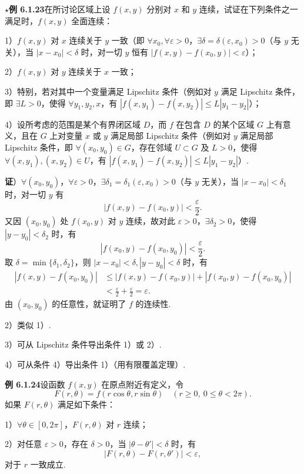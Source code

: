 \documentclass[UTF8,12pt,a4paper,fontset=fandol]{ctexart}
\begin{document}
\noindent\textbf{$\star$例 6.1.23}\quad 在所讨论区域上设 $f(x,y)$ 分别对 $x$ 和 $y$ 连续，试证在下列条件之一满足时，$f(x,y)$ 全面连续：

1）$f(x,y)$ 对 $x$ 连续关于 $y$ 一致（即 $\forall x_0,\forall\varepsilon>0$，$\exists\delta=\delta(\varepsilon,x_0)>0$（与 $y$ 无关），当 $|x-x_0|<\delta$ 时，对一切 $y$ 恒有 $|f(x,y)-f(x_0,y)|<\varepsilon$）；

2）$f(x,y)$ 对 $y$ 连续关于 $x$ 一致；

3）特别，若对其中一个变量满足 Lipschitz 条件（例如对 $y$ 满足 Lipschitz 条件，即 $\exists L>0$，使得 $\forall y_1,y_2,x$，有 $|f(x,y_1)-f(x,y_2)|\le L|y_1-y_2|$）；

4）设所考虑的范围是某个有界闭区域 $D$，而 $f$ 在包含 $D$ 的某个区域 $G$ 上有意义，且在 $G$ 上对变量 $x$ 或 $y$ 满足局部 Lipschitz 条件（例如对 $y$ 满足局部 Lipschitz 条件，即 $\forall(x_0,y_0)\in G$，存在邻域 $U\subset G$ 及 $L>0$，使得 $\forall(x,y_1),(x,y_2)\in U$，有 $|f(x,y_1)-f(x,y_2)|\le L|y_1-y_2|$）.

\noindent\textbf{证}）$\forall(x_0,y_0)$，$\forall\varepsilon>0$，$\exists\delta_1=\delta_1(\varepsilon,x_0)>0$（与 $y$ 无关），当 $|x-x_0|<\delta_1$ 时，对一切 $y$ 有
\[
  |f(x,y)-f(x_0,y)|<\frac{\varepsilon}{2}.
\]
又因 $(x_0,y_0)$ 处 $f(x_0,y)$ 对 $y$ 连续，故对此 $\varepsilon>0$，$\exists\delta_2>0$，使得 $|y-y_0|<\delta_2$ 时，有
\[
  |f(x_0,y)-f(x_0,y_0)|<\frac{\varepsilon}{2}.
\]
取 $\delta=\min\{\delta_1,\delta_2\}$，则 $|x-x_0|<\delta,|y-y_0|<\delta$ 时，有
\[
\begin{aligned}
|f(x,y)-f(x_0,y_0)|
&\le |f(x,y)-f(x_0,y)|+|f(x_0,y)-f(x_0,y_0)|\\
&<\frac{\varepsilon}{2}+\frac{\varepsilon}{2}=\varepsilon.
\end{aligned}
\]
由 $(x_0,y_0)$ 的任意性，就证明了 $f$ 的连续性.

2）类似 1）.

3）可从 Lipschitz 条件导出条件 1）或 2）.

4）可从条件 4）导出条件 1）（用有限覆盖定理）.

\noindent\textbf{例 6.1.24}\quad 设函数 $f(x,y)$ 在原点附近有定义，令
\[
  F(r,\theta)=f(r\cos\theta,r\sin\theta)\quad(r\ge0,\ 0\le\theta<2\pi).
\]
如果 $F(r,\theta)$ 满足如下条件：

1）$\forall\theta\in[0,2\pi]$，$F(r,\theta)$ 对 $r$ 连续；

2）对任意 $\varepsilon>0$，存在 $\delta>0$，当 $|\theta-\theta'|<\delta$ 时，有
\[
  |F(r,\theta)-F(r,\theta')|<\varepsilon,
\]
对于 $r$ 一致成立.
\end{document}
